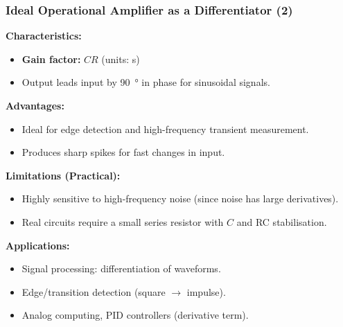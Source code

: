 \begin{frame}
	\frametitle{Ideal Operational Amplifier as a Differentiator (2)}
	\small
	\textbf{Characteristics:}
	\begin{itemize}
		\item \textbf{Gain factor:} $CR$ (units: \si{\second})
		\item Output leads input by \SI{90}{\degree} in phase for sinusoidal signals.
	\end{itemize}
	\textbf{Advantages:}
	\begin{itemize}
		\item Ideal for edge detection and high-frequency transient measurement.
		\item Produces sharp spikes for fast changes in input.
	\end{itemize}
	\textbf{Limitations (Practical):}
	\begin{itemize}
		\item Highly sensitive to high-frequency noise (since noise has large derivatives).
		\item Real circuits require a small series resistor with $C$ and RC stabilisation.
	\end{itemize}
	\textbf{Applications:}
	\begin{itemize}
		\item Signal processing: differentiation of waveforms.
		\item Edge/transition detection (square $\rightarrow$ impulse).
		\item Analog computing, PID controllers (derivative term).
	\end{itemize}
\end{frame}

